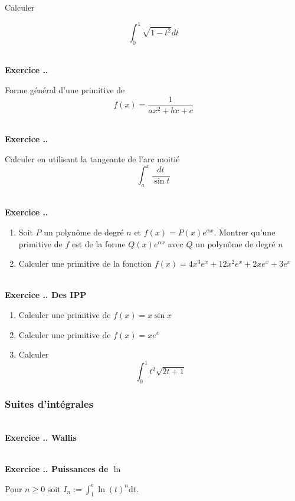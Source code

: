 \documentclass{article}
\newcommand{\di}{\mathrm{d}}
\newcommand{\ex}{{\operatorname{e}}}
\newcounter{exo}
\newcommand{\exercice}[1][\null]{\textbf{\\ Exercice \thesection.\theexo. #1} \addtocounter{exo}{1}}
\begin{document}
Calculer 

\begin{equation*}
    \int_0^1 \sqrt{1 - t^2} dt 
\end{equation*}

\exercice 

Forme général d'une primitive de 
\begin{equation*}
    f(x) = \frac{1}{ax^2 + bx + c}
\end{equation*}

\exercice 

Calculer en utilisant la tangeante de l'arc moitié
\begin{equation*}
    \int_a^x \frac{dt}{\sin t}
\end{equation*}


\exercice

\begin{enumerate}
    \item Soit $P$ un polynôme de degré $n$ et 
        $f(x) = P(x) e^{\alpha x}$. Montrer qu'une 
        primitive de $f$ est de la forme $Q(x) e^{\alpha x}$
        avec $Q$ un polynôme de degré $n$

    \item Calculer une primitive de 
        la fonction $f(x) = 4x^3 e^x + 12x^2 e^x + 2x e^x + 3e^x$
\end{enumerate}

\exercice[Des IPP]

\begin{enumerate}
    \item Calculer une primitive de $f(x) = x \sin x$
    \item Calculer une primitive de $f(x) = x e^x$
    \item Calculer 
        \begin{equation*}
            \int_0^1 t^2 \sqrt{2t + 1}
        \end{equation*}
\end{enumerate}



\subsubsection{Suites d'intégrales}


\exercice[Wallis]

\exercice[Puissances de $\ln$]

Pour $n \ge 0$ soit $\displaystyle I_n := \int_{1}^{\ex} \ln(t)^n {\di} t$.
\end{document}
